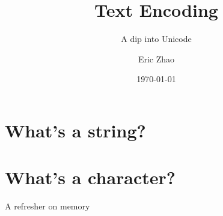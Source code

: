 \documentclass{beamer}
\title{Text Encoding}
\subtitle{A dip into Unicode}
\date{\today}
\author{Eric Zhao}
\begin{document}
  \maketitle
  \section{What's a string?}
  \section{What's a character?}
  \begin{frame}{A refresher on memory}
  \end{frame}
\end{document}
